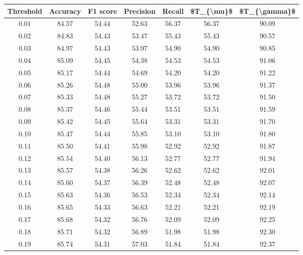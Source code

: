 \begin{tabular}{|c|c|c|c|c|c|c|}
\hline
 Threshold &  Accuracy &  F1 score &  Precision &  Recall &  \$T\_\{\textbackslash mu\}\$ &  \$T\_\{\textbackslash gamma\}\$ \\
\hline
      0.01 &     84.57 &     54.44 &      52.63 &   56.37 &      56.37 &         90.09 \\
      0.02 &     84.83 &     54.43 &      53.47 &   55.43 &      55.43 &         90.57 \\
      0.03 &     84.97 &     54.43 &      53.97 &   54.90 &      54.90 &         90.85 \\
      0.04 &     85.09 &     54.45 &      54.38 &   54.53 &      54.53 &         91.06 \\
      0.05 &     85.17 &     54.44 &      54.69 &   54.20 &      54.20 &         91.22 \\
      0.06 &     85.26 &     54.48 &      55.00 &   53.96 &      53.96 &         91.37 \\
      0.07 &     85.33 &     54.48 &      55.27 &   53.72 &      53.72 &         91.50 \\
      0.08 &     85.37 &     54.46 &      55.44 &   53.51 &      53.51 &         91.59 \\
      0.09 &     85.42 &     54.45 &      55.64 &   53.31 &      53.31 &         91.70 \\
      0.10 &     85.47 &     54.44 &      55.85 &   53.10 &      53.10 &         91.80 \\
      0.11 &     85.50 &     54.41 &      55.98 &   52.92 &      52.92 &         91.87 \\
      0.12 &     85.54 &     54.40 &      56.13 &   52.77 &      52.77 &         91.94 \\
      0.13 &     85.57 &     54.38 &      56.26 &   52.62 &      52.62 &         92.01 \\
      0.14 &     85.60 &     54.37 &      56.39 &   52.48 &      52.48 &         92.07 \\
      0.15 &     85.63 &     54.36 &      56.53 &   52.34 &      52.34 &         92.14 \\
      0.16 &     85.65 &     54.33 &      56.63 &   52.21 &      52.21 &         92.19 \\
      0.17 &     85.68 &     54.32 &      56.76 &   52.09 &      52.09 &         92.25 \\
      0.18 &     85.71 &     54.32 &      56.89 &   51.98 &      51.98 &         92.30 \\
      0.19 &     85.74 &     54.31 &      57.03 &   51.84 &      51.84 &         92.37 \\

\end{tabular}
